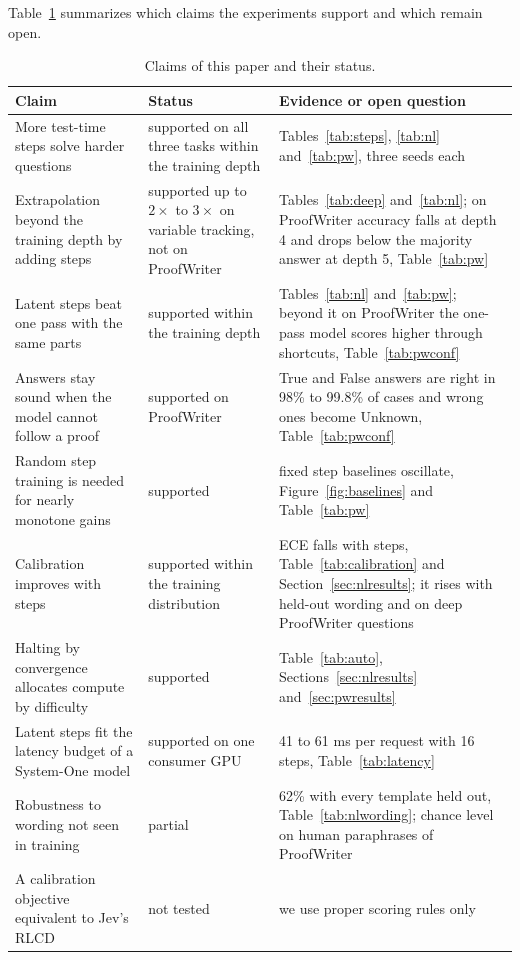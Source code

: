 \documentclass{article}
\begin{document}
Table~\ref{tab:claims} summarizes which claims the experiments support and which remain open.

\begin{table}[t]
\centering
\small
\caption{Claims of this paper and their status.}
\label{tab:claims}
\begin{tabular}{@{}p{5.4cm}p{2.3cm}p{6.0cm}@{}}
\toprule
Claim & Status & Evidence or open question \\
\midrule
More test-time steps solve harder questions & supported on all three tasks within the training depth & Tables~\ref{tab:steps}, \ref{tab:nl} and~\ref{tab:pw}, three seeds each \\
Extrapolation beyond the training depth by adding steps & supported up to $2\times$ to $3\times$ on variable tracking, not on ProofWriter & Tables~\ref{tab:deep} and~\ref{tab:nl}; on ProofWriter accuracy falls at depth 4 and drops below the majority answer at depth 5, Table~\ref{tab:pw} \\
Latent steps beat one pass with the same parts & supported within the training depth & Tables~\ref{tab:nl} and~\ref{tab:pw}; beyond it on ProofWriter the one-pass model scores higher through shortcuts, Table~\ref{tab:pwconf} \\
Answers stay sound when the model cannot follow a proof & supported on ProofWriter & True and False answers are right in 98\% to 99.8\% of cases and wrong ones become Unknown, Table~\ref{tab:pwconf} \\
Random step training is needed for nearly monotone gains & supported & fixed step baselines oscillate, Figure~\ref{fig:baselines} and Table~\ref{tab:pw} \\
Calibration improves with steps & supported within the training distribution & ECE falls with steps, Table~\ref{tab:calibration} and Section~\ref{sec:nlresults}; it rises with held-out wording and on deep ProofWriter questions \\
Halting by convergence allocates compute by difficulty & supported & Table~\ref{tab:auto}, Sections~\ref{sec:nlresults} and~\ref{sec:pwresults} \\
Latent steps fit the latency budget of a System-One model & supported on one consumer GPU & 41 to 61 ms per request with 16 steps, Table~\ref{tab:latency} \\
Robustness to wording not seen in training & partial & 62\% with every template held out, Table~\ref{tab:nlwording}; chance level on human paraphrases of ProofWriter \\
A calibration objective equivalent to Jev's RLCD & not tested & we use proper scoring rules only \\
\bottomrule
\end{tabular}
\end{table}
\end{document}
